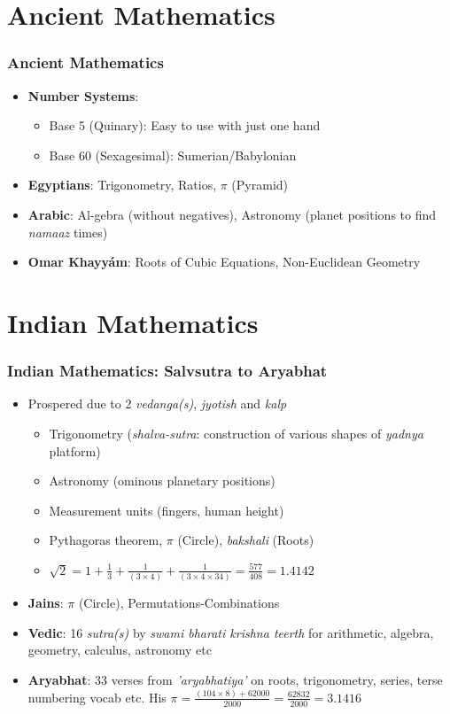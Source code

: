 \section{Ancient Mathematics}

\begin{frame}[fragile]
\frametitle{Ancient Mathematics}
\begin{itemize} 
\item \textbf{Number Systems}:
	\begin{itemize}
	\item Base 5 (Quinary): Easy to use with just one hand
	\item Base 60 (Sexagesimal): Sumerian/Babylonian
	\end{itemize}
\item \textbf{Egyptians}: Trigonometry, Ratios, $\pi$ (Pyramid)
\item \textbf{Arabic}: Al-gebra (without negatives), Astronomy (planet positions to find {\it namaaz} times)
\item \textbf{Omar Khayy\'am}: Roots of Cubic Equations, Non-Euclidean Geometry
\end{itemize}
\end{frame}

\section{Indian Mathematics}

\begin{frame}[fragile]
\frametitle{Indian Mathematics: Salvsutra to Aryabhat}
\begin{itemize}
\item Prospered due to 2 {\it vedanga(s)}, {\it jyotish} and {\it kalp}
	\begin{itemize}
	\item Trigonometry ({\it shalva-sutra}: construction of various shapes of {\it yadnya} platform)
	\item Astronomy (ominous planetary positions)
	\item Measurement units (fingers, human height)
	\item Pythagoras theorem, $\pi$ (Circle), {\it bakshali} (Roots)
	\item $\sqrt{2} = 1 + \frac{1}{3} + \frac{1}{(3 \times 4)} + \frac{1}{(3 \times 4 \times 34)} = \frac{577}{408} = 1.4142$
	\end{itemize}
\item \textbf{Jains}: $\pi$ (Circle), Permutations-Combinations
\item \textbf{Vedic}: 16 {\it sutra(s)} by {\it swami bharati krishna teerth} for  arithmetic, algebra, geometry, calculus, astronomy etc
\item \textbf{Aryabhat}: 33 verses from {\it 'aryabhatiya'} on roots, trigonometry, series, terse numbering vocab etc. His $\pi =  \frac{(104 \times 8)+62000}{2000} = \frac{62832}{2000} = 3.1416$
\end{itemize}
\end{frame}

